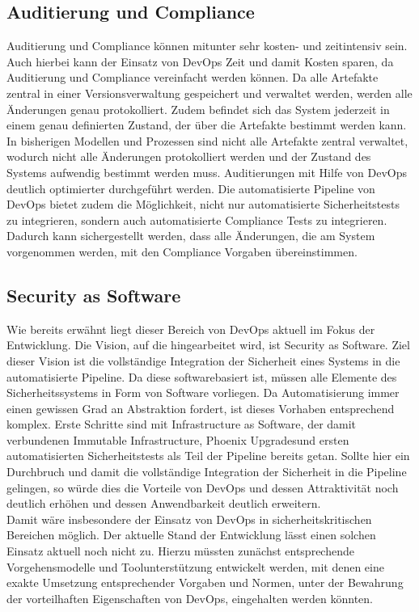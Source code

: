 \subsection{Auditierung und Compliance}
Auditierung und Compliance können mitunter sehr kosten- und zeitintensiv sein. Auch hierbei kann der Einsatz von DevOps Zeit und damit Kosten sparen, da Auditierung und Compliance vereinfacht werden können. Da alle Artefakte zentral in einer Versionsverwaltung gespeichert und verwaltet werden, werden alle Änderungen genau protokolliert. Zudem befindet sich das System jederzeit in einem genau definierten Zustand, der über die Artefakte bestimmt werden kann. In bisherigen Modellen und Prozessen sind nicht alle Artefakte zentral verwaltet, wodurch nicht alle Änderungen protokolliert werden und der Zustand des Systems aufwendig bestimmt werden muss. Auditierungen mit Hilfe von DevOps deutlich optimierter durchgeführt werden. Die automatisierte Pipeline von DevOps bietet zudem die Möglichkeit, nicht nur automatisierte Sicherheitstests zu integrieren, sondern auch automatisierte Compliance Tests zu integrieren. Dadurch kann sichergestellt werden, dass alle Änderungen, die am System vorgenommen werden, mit den Compliance Vorgaben übereinstimmen.\\

\subsection{Security as Software}
Wie bereits erwähnt liegt dieser Bereich von DevOps aktuell im Fokus der Entwicklung. Die Vision, auf die hingearbeitet wird, ist \glqq Security as Software\grqq. Ziel dieser Vision ist die vollständige Integration der Sicherheit eines Systems in die automatisierte Pipeline. Da diese softwarebasiert ist, müssen alle Elemente des Sicherheitssystems in Form von Software vorliegen. Da Automatisierung immer einen gewissen Grad an Abstraktion fordert, ist dieses Vorhaben entsprechend komplex. Erste Schritte sind mit \glqq Infrastructure as Software\grqq, der damit verbundenen \glqq Immutable Infrastructure\grqq, \glqq Phoenix Upgrades\grqq und ersten automatisierten Sicherheitstests als Teil der Pipeline bereits getan. Sollte hier ein Durchbruch und damit die vollständige Integration der Sicherheit in die Pipeline gelingen, so würde dies die Vorteile von DevOps und dessen Attraktivität noch deutlich erhöhen und dessen Anwendbarkeit deutlich erweitern.\\
Damit wäre insbesondere der Einsatz von DevOps in sicherheitskritischen Bereichen möglich. Der aktuelle Stand der Entwicklung lässt einen solchen Einsatz aktuell noch nicht zu. Hierzu müssten zunächst entsprechende Vorgehensmodelle und Toolunterstützung entwickelt werden, mit denen eine exakte Umsetzung entsprechender Vorgaben und Normen, unter der Bewahrung der vorteilhaften Eigenschaften von DevOps, eingehalten werden könnten.

